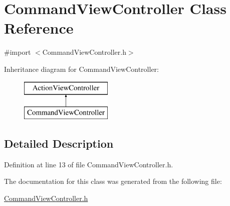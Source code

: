 \hypertarget{interface_command_view_controller}{
\section{CommandViewController Class Reference}
\label{interface_command_view_controller}
}


{\ttfamily \#import $<$CommandViewController.h$>$}

Inheritance diagram for CommandViewController:\begin{figure}[H]
\begin{center}
\leavevmode
\includegraphics[height=2.000000cm]{interface_command_view_controller}
\end{center}
\end{figure}


\subsection{Detailed Description}


Definition at line 13 of file CommandViewController.h.



The documentation for this class was generated from the following file:\begin{DoxyCompactItemize}
\item 
\hyperlink{_command_view_controller_8h}{CommandViewController.h}\end{DoxyCompactItemize}
